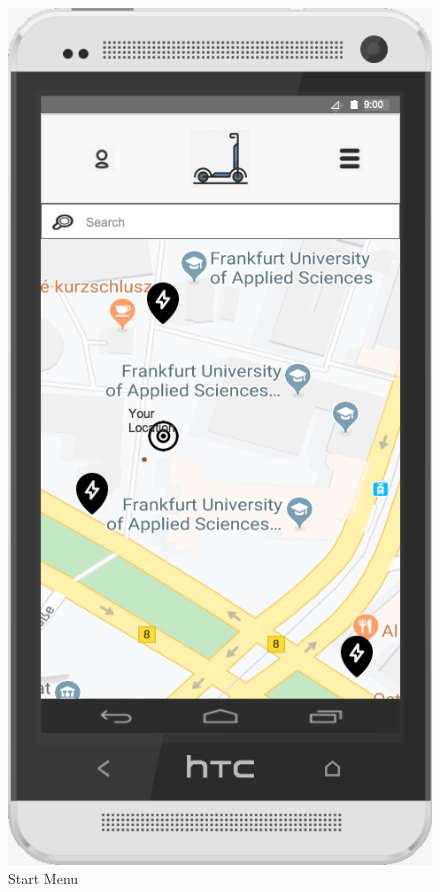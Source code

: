\documentclass[a4paper, 12pt]{article}
\begin{document}
\begin{figure} [htbp]
  \begin{center}
    \includegraphics[scale=0.5]{images/prototypes/02-start-menu.png}
  \end{center}
  \caption{Start Menu}
\end{figure}
\end{document}

